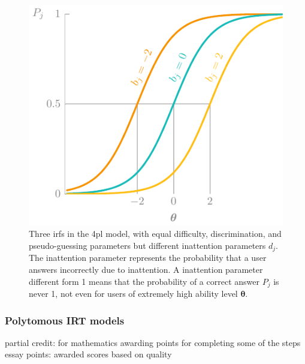 \begin{figure}
    \centering
    \includegraphics[page=5]{03-education/figures/tikzfigures.pdf}
    \caption[Item response functions of the 4PL model]{Three \glspl{irf} in the \gls{4pl} model, with equal difficulty, discrimination, and pseudo-guessing parameters but different inattention parameters $d_j$. The inattention parameter represents the probability that a user answers incorrectly due to inattention. A inattention parameter different form 1 means that the probability of a correct answer $P_j$ is never 1, not even for users of extremely high ability level $\bm\theta$.}
    \label{fig:4pl}
\end{figure}

\subsubsection{Polytomous IRT models}
partial credit: for mathematics awarding points for completing some of the steps
essay points: awarded scores based on quality

